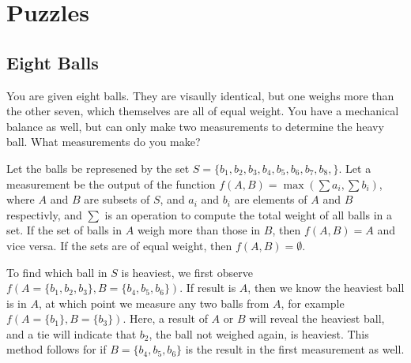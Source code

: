 \documentclass[12pt]{article}
\begin{document}
	
	\pagebreak

	
	\pagebreak

	
	\pagebreak

	
	\pagebreak

	
	\pagebreak

	\normalsize
	\section{Puzzles}
	\subsection{Eight Balls}
	You are given eight balls. They are visaully identical, but one weighs more than the other seven, which themselves are all of equal weight. You have a mechanical balance as well, but can only make two measurements to determine the heavy ball. What measurements do you make? \linebreak

	Let the balls be represened by the set $S = \{b_1, b_2, b_3, b_4, b_5, b_6, b_7, b_8, \}$. Let a measurement be the output of the function $f(A, B) =  \max(\sum a_i, \sum b_i)$, where $A$ and $B$ are subsets of $S$, and $a_i$ and $b_i$ are elements of $A$ and $B$ respectivly, and $\sum$ is an operation to compute the total weight of all balls in a set. If the set of balls in $A$ weigh more than those in $B$, then $f(A, B) = A$ and vice versa. If the sets are of equal weight, then $f(A, B) = \emptyset$. \hfill \null \linebreak

	To find which ball in $S$ is heaviest, we first observe $f(A = \{b_1, b_2, b_3\}, B = \{b_4, b_5, b_6\})$. If result is $A$, then we know the heaviest ball is in $A$, at which point we measure any two balls from $A$, for example $f(A = \{b_1\}, B = \{b_3\})$. Here, a result of $A$ or $B$ will reveal the heaviest ball, and a tie will indicate that $b_2$, the ball not weighed again, is heaviest. This method follows for if $B = \{b_4, b_5, b_6\}$ is the result in the first measurement as well. \linebreak
\end{document}
